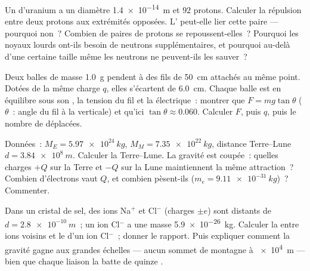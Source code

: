 \begin{exercise}[$\star\star\star$]\label{exo:g11:fundamental-interactions:12}
Un  d'uranium a un diamètre
\qty{1.4e-14}{m} et $92$ protons. Calculer la répulsion entre deux
protons aux extrémités opposées. L' peut-elle lier cette paire --- pourquoi non~? Combien de paires
de protons se repoussent-elles~? Pourquoi les noyaux lourds ont-ils
besoin de neutrons supplémentaires, et pourquoi au-delà d'une certaine
taille même les neutrons ne peuvent-ils les sauver~?
\end{exercise}

\begin{exercise}[$\star\star\star$]\label{exo:g11:fundamental-interactions:13}
Deux balles de masse \qty{1.0}{g} pendent à des fils de \qty{50}{cm}
attachés au même point. Dotées de la même charge $q$, elles s'écartent
de \qty{6.0}{cm}. Chaque balle est en équilibre sous son
, la tension
du fil et la  électrique~: montrer que
$F = mg\tan\theta$ ($\theta$~: angle du fil à la verticale) et qu'ici
$\tan\theta \approx 0.060$. Calculer $F$, puis $q$, puis le nombre de
 déplacées.
\end{exercise}

\begin{exercise}[$\star\star\star$]\label{exo:g11:fundamental-interactions:14}
Données~: $M_E = \qty{5.97e24}{kg}$, $M_M = \qty{7.35e22}{kg}$, distance
Terre--Lune $d = \qty{3.84e8}{m}$. Calculer la
 Terre--Lune. La
gravité est coupée~: quelles charges $+Q$ sur la Terre et $-Q$ sur la
Lune maintiennent la même attraction~? Combien d'électrons vaut $Q$, et
combien pèsent-ils ($m_e = \qty{9.11e-31}{kg}$)~? Commenter.
\end{exercise}

\begin{exercise}[$\star\star\star$]\label{exo:g11:fundamental-interactions:15}
Dans un cristal de sel, des ions Na$^{+}$ et Cl$^{-}$ (charges $\pm e$)
sont distants de $d = \qty{2.8e-10}{m}$~; un ion Cl$^{-}$ a une masse
\qty{5.9e-26}{kg}. Calculer la  entre
ions voisins et le  d'un ion Cl$^{-}$~;
donner le rapport. Puis expliquer comment la gravité gagne aux grandes
échelles --- aucun sommet de montagne à \qty{e4}{m} --- bien que chaque
liaison la batte de quinze .
\end{exercise}

